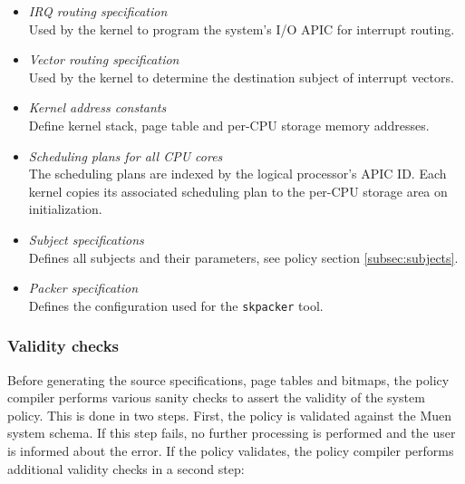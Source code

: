 \begin{itemize}
	\item \emph{IRQ routing specification}\\
		Used by the kernel to program the system's I/O APIC for interrupt
		routing.
	\item \emph{Vector routing specification}\\
		Used by the kernel to determine the destination subject of interrupt
		vectors.
	\item \emph{Kernel address constants}\\
		Define kernel stack, page table and per-CPU storage memory addresses.
	\item \emph{Scheduling plans for all CPU cores}\\
		The scheduling plans are indexed by the logical processor's APIC ID.
		Each kernel copies its associated scheduling plan to the per-CPU storage
		area on initialization.
	\item \emph{Subject specifications}\\
		Defines all subjects and their parameters, see policy section
		\ref{subsec:subjects}.
	\item \emph{Packer specification}\\
		Defines the configuration used for the \texttt{skpacker} tool.
\end{itemize}

\subsubsection{Validity checks}
Before generating the source specifications, page tables and bitmaps, the policy
compiler performs various sanity checks to assert the validity of the system
policy. This is done in two steps. First, the policy is validated against the
Muen system schema. If this step fails, no further processing is performed and
the user is informed about the error. If the policy validates, the policy
compiler performs additional validity checks in a second step:

